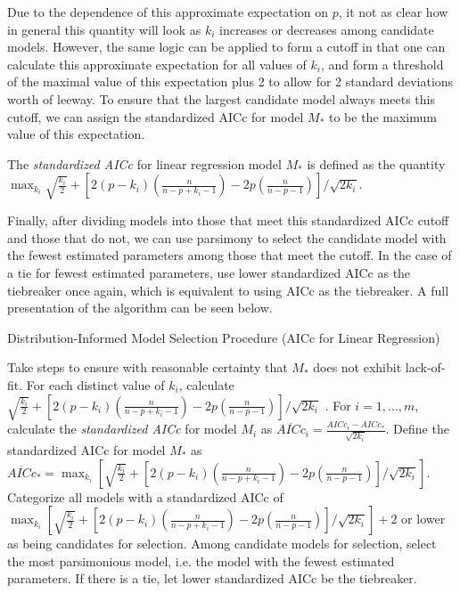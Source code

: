 		Due to the dependence of this approximate expectation on $p$, it not as clear how in general this quantity will look as $k_i$ increases
		or decreases among candidate models. However, the same logic can be applied to form a cutoff in that one can calculate this approximate
		expectation for all values of $k_i$, and form a threshold of the maximal value of this expectation plus 2 to allow for 2 standard deviations
		worth of leeway. To ensure that the largest candidate model always meets this cutoff, we can assign the standardized AICc for model $M_*$
		to be the maximum value of this expectation.
		\begin{definition}
			The \textit{standardized AICc} for linear regression model $M_*$ is defined as the quantity
			$\max_{k_i} \sqrt{\frac{k_i}{2}} + \left[ 2(p-k_i) \left( \frac{n}{n-p+k_i-1} \right) - 2p \left( \frac{n}{n-p-1} \right) \right] / \sqrt{2k_i}$.
		\end{definition}

		Finally, after dividing models into those that meet this standardized AICc cutoff and those that do not, we can use parsimony to select
		the candidate model with the fewest estimated parameters among those that meet the cutoff. In the case of a tie for fewest estimated parameters,
		use lower standardized AICc as the tiebreaker once again, which is equivalent to using AICc as the tiebreaker. A full presentation of
		the algorithm can be seen below.

		\begin{algorithm}[H]
			\caption{Distribution-Informed Model Selection Procedure (AICc for Linear Regression)}
			\begin{algorithmic}[1]
			  \State Take steps to ensure with reasonable certainty that $M_*$ does not exhibit lack-of-fit.
			  \State For each distinct value of $k_i$, calculate $\sqrt{\frac{k_i}{2}} + \left[ 2(p-k_i) \left( \frac{n}{n-p+k_i-1} \right) - 2p \left( \frac{n}{n-p-1} \right) \right] / \sqrt{2k_i}$ .
			  \State For $i = 1,...,m$, calculate the \textit{standardized AICc} for model $M_i$ as 
			  $\overline{AICc}_i = \frac{AICc_i - AICc_*}{\sqrt{2k_i}}$. Define the standardized AICc for model
			  $M_*$ as $\overline{AICc}_* = \max_{k_i} \left[ \sqrt{\frac{k_i}{2}} + \left[ 2(p-k_i) \left( \frac{n}{n-p+k_i-1} \right) - 2p \left( \frac{n}{n-p-1} \right) \right] / \sqrt{2k_i} \right]$.
			  \State Categorize all models with a standardized AICc of
			  $ \max_{k_i} \left[ \sqrt{\frac{k_i}{2}} + \left[ 2(p-k_i) \left( \frac{n}{n-p+k_i-1} \right) - 2p \left( \frac{n}{n-p-1} \right) \right] / \sqrt{2k_i} \right] + 2$
			  or lower as being candidates for selection.
			  \State Among candidate models for selection, select the most parsimonious model, i.e. the model
			  with the fewest estimated parameters. If there is a tie, let lower standardized AICc be the
			  tiebreaker.
			\end{algorithmic}
		\end{algorithm}


